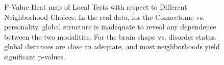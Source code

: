 \documentclass[11pt]{article}
\begin{document}
\begin{figure}[htbp]
\centering
{}
\hfil
\centering
{}
\hfil
\centering
{}
\hfil
\centering
{}
\caption{P-Value Heat map of Local Tests with respect to Different Neighborhood Choices. In the real data, for the Connectome vs. personality, global structure is inadequate to reveal any dependence between the two modalities.  For the brain shape vs. disorder status,  global distances are close to adequate, and most neighborhoods yield significant p-values.}
\label{figReal}
\end{figure}
\end{document}
